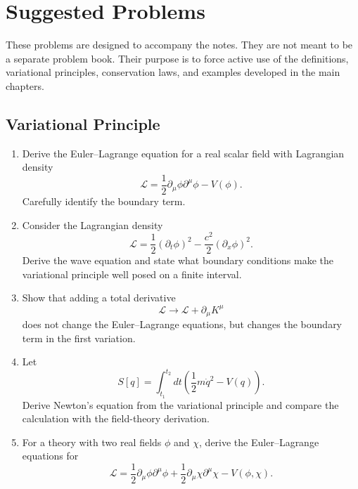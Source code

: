\chapter{Suggested Problems}

\begin{remarkbox}
These problems are designed to accompany the notes. They are not meant to be a
separate problem book. Their purpose is to force active use of the definitions,
variational principles, conservation laws, and examples developed in the main
chapters.
\end{remarkbox}

\section{Variational Principle}

\begin{enumerate}
    \item Derive the Euler--Lagrange equation for a real scalar field with
    Lagrangian density
    \[
        \mathcal{L}=\frac{1}{2}\partial_\mu\phi\partial^\mu\phi-V(\phi).
    \]
    Carefully identify the boundary term.

    \item Consider the Lagrangian density
    \[
        \mathcal{L}=\frac{1}{2}(\partial_t\phi)^2
        -\frac{c^2}{2}(\partial_x\phi)^2.
    \]
    Derive the wave equation and state what boundary conditions make the
    variational principle well posed on a finite interval.

    \item Show that adding a total derivative
    \[
        \mathcal{L}\longrightarrow \mathcal{L}+\partial_\mu K^\mu
    \]
    does not change the Euler--Lagrange equations, but changes the boundary term
    in the first variation.

    \item Let
    \[
        S[q]=\int_{t_1}^{t_2}dt\left(\frac{1}{2}m\dot q^2-V(q)\right).
    \]
    Derive Newton's equation from the variational principle and compare the
    calculation with the field-theory derivation.

    \item For a theory with two real fields \(\phi\) and \(\chi\), derive the
    Euler--Lagrange equations for
    \[
        \mathcal{L}=\frac{1}{2}\partial_\mu\phi\partial^\mu\phi
        +\frac{1}{2}\partial_\mu\chi\partial^\mu\chi
        -V(\phi,\chi).
    \]
\end{enumerate}

